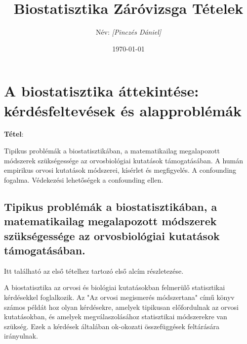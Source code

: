 \documentclass[a4paper,12pt]{article}
\title{\textbf{Biostatisztika Záróvizsga Tételek}}
\author{Név: \textit{[Pinczés Dániel]}}
\date{\today}
\begin{document}
    \maketitle
    \thispagestyle{empty}
    \newpage

    \tableofcontents
    \newpage



    \section{A biostatisztika áttekintése: kérdésfeltevések és alapproblémák}

    \textbf{Tétel}:

    Tipikus problémák a biostatisztikában, a matematikailag megalapozott módszerek
    szükségessége az orvosbiológiai kutatások támogatásában. A humán empirikus orvosi
    kutatások módszerei, kísérlet és megfigyelés. A confounding fogalma. Védekezési
    lehetőségek a confounding ellen.

    \subsection{Tipikus problémák a biostatisztikában, a matematikailag megalapozott módszerek
    szükségessége az orvosbiológiai kutatások támogatásában.}
    Itt található az első tételhez tartozó első alcím részletezése.

    A biostatisztika az orvosi és biológiai kutatásokban felmerülő statisztikai kérdésekkel foglalkozik. Az "Az orvosi megismerés módszertana" című könyv számos példát hoz olyan kérdésekre, amelyek tipikusan előfordulnak az orvosi kutatásokban, és amelyek megválaszolásához statisztikai módszerekre van szükség. Ezek a kérdések általában ok-okozati összefüggések feltárására irányulnak.
\end{document}
